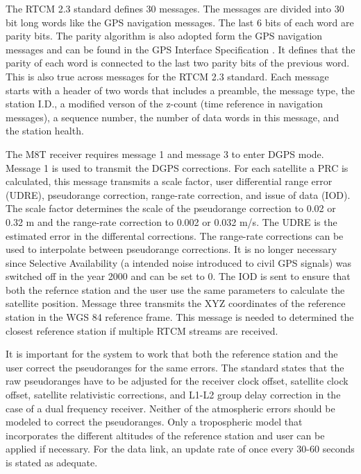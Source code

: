 The RTCM 2.3 standard defines 30 messages.
The messages are divided into 30 bit long words like the GPS navigation messages.
The last 6 bits of each word are parity bits.
The parity algorithm is also adopted form the GPS navigation messages and can be found in the GPS Interface Specification \cite{IS-GPS-200}.
It defines that the parity of each word is connected to the last two parity bits of the previous word.
This is also true across messages for the RTCM 2.3 standard.
Each message starts with a header of two words that includes a preamble, the message type, the station I.D., a modified verson of the z-count (time reference in navigation messages), a sequence number, the number of data words in this message, and the station health.

The M8T receiver requires message 1 and message 3 to enter DGPS mode.
Message 1 is used to transmit the DGPS corrections.
For each satellite a PRC is calculated, this message transmits a scale factor, user differential range error (UDRE), pseudorange correction, range-rate correction, and issue of data (IOD).
The scale factor determines the scale of the pseudorange correction to 0.02 or 0.32 m and the range-rate correction to 0.002 or 0.032 m/s.
The UDRE is the estimated error in the differental corrections.
The range-rate corrections can be used to interpolate between pseudorange corrections.
It is no longer necessary since Selective Availability (a intended noise introduced to civil GPS signals) was switched off in the year 2000 and can be set to 0.
The IOD is sent to ensure that both the refernce station and the user use the same parameters to calculate the satellite position.
Message three transmits the XYZ coordinates of the reference station in the WGS 84 reference frame.
This message is needed to determined the closest reference station if multiple RTCM streams are received.

It is important for the system to work that both the reference station and the user correct the pseudoranges for the same errors.
The standard states that the raw pseudoranges have to be adjusted for the receiver clock offset, satellite clock offset, satellite relativistic corrections, and L1-L2 group delay correction in the case of a dual frequency receiver.
Neither of the atmospheric errors should be modeled to correct the pseudoranges.
Only a tropospheric model that incorporates the different altitudes of the reference station and user can be applied if necessary.
For the data link, an update rate of once every 30-60 seconds is stated as adequate.


